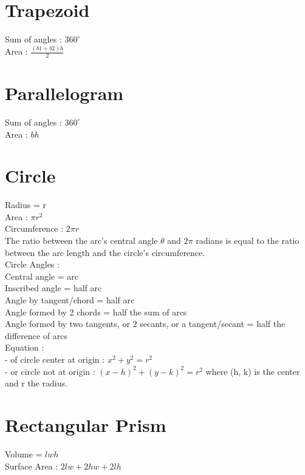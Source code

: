 \documentclass[10pt,onecolumn]{article}
\begin{document}
{%
\section{Trapezoid }
Sum of angles : \(360^\circ \) \\
Area : \(\frac{(b1 + b2)h}{2}\) \\

\section{Parallelogram }
Sum of angles : \(360^\circ \) \\
Area : \(bh\)

\section{Circle }
Radius = r \\
Area : \(\pi r^2\) \\
Circumference : \(2\pi r\) \\
The ratio between the arc's central angle \(\theta\) and \(2 \pi \) radians is equal to the ratio between the arc length and the circle's circumference. \\

Circle Angles : \\
Central angle = arc \\
Inscribed angle = half arc \\
Angle by tangent/chord = half arc \\
Angle formed by 2 chords = half the sum of arcs \\
Angle formed by two tangents, or 2 secants, or a tangent/secant = half the difference of arcs \\

Equation : \\
- of circle center at origin : \(x^2 + y^2 = r^2\) \\
- or circle not at origin : \((x - h)^2 + (y - k)^2 = r^2\) where (h, k) is the center and r the radius. \\

\section{Rectangular Prism}
Volume = \(lwh\) \\
Surface Area : \(2lw + 2hw + 2lh\) \\

}
\end{document}

